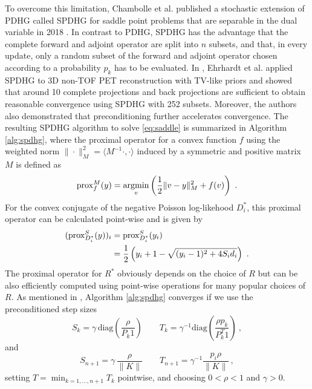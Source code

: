 To overcome this limitation, Chambolle et al. published a stochastic extension of PDHG called SPDHG 
for saddle point problems that are separable in the dual variable in 2018 \cite{Chambolle2018}.
In contrast to PDHG, SPDHG has the advantage that the complete forward and adjoint operator are
split into $n$ subsets, and that, in every update, only a random subset of the forward
and adjoint operator chosen according to a probability $p_k$ has to be evaluated.
In \cite{Ehrhardt2019}, Ehrhardt et al. applied SPDHG to 3D non-TOF PET reconstruction with TV-like
priors and showed that around 10 complete projections and back projections are sufficient 
to obtain reasonable convergence using SPDHG with 252 subsets.
Moreover, the authors also demonstrated that preconditioning further accelerates convergence.
The resulting SPDHG algorithm to solve \eqref{eq:saddle} is summarized in Algorithm \ref{alg:spdhg},
where the proximal operator for a convex function $f$ using the weighted norm 
$\| \cdot \|_M^2 = \langle M^{-1} \cdot, \cdot \rangle$ induced by a symmetric and positive matrix $M$ 
is defined as
%
\begin{equation}
\operatorname{prox}_{f}^{M}(y) = \operatorname*{argmin}_v \left( \frac{1}{2} \| v - y  \|_M^2 + f(v) \right) \ .
\end{equation}
%
For the convex conjugate of the negative Poisson log-likehood $D_i^*$, this proximal operator
can be calculated point-wise and is given by
%
\begin{equation}
\begin{split}
(\operatorname{prox}_{D_i^*}^{S}(y))_i &= \operatorname{prox}_{D_i^*}^{S}(y_i) \\ 
&= \frac{1}{2} \left(y_i + 1 - \sqrt{ (y_i-1)^2 + 4 S_i d_i} \right) \ .
\end{split}
\label{eq:proxD}
\end{equation} 
%
The proximal operator for $R^*$ obviously depends on the choice of $R$ but can be also efficiently 
computed using point-wise operations for many popular choices of $R$.
As mentioned in \cite{Ehrhardt2019}, Algorithm \ref{alg:spdhg} converges if we use the preconditioned
step sizes
%
\[ S_k = \gamma \, \text{diag}(\frac{\rho}{P_k 1} )\qquad  T_k = \gamma^{-1} \text{diag}(\frac{\rho p_k}{P^T_k 1}) \ , \]
% 
and
%
\[ S_{n+1} = \gamma \, \frac{\rho}{\|K\|} \qquad T_{n+1} = \gamma^{-1} \frac{p_i\rho}{\|K\|} \ , \]
%
setting $T = \min_{k=1,\ldots,n+1} T_k$ pointwise, and choosing $0<\rho<1$ and $\gamma>0$.
%
